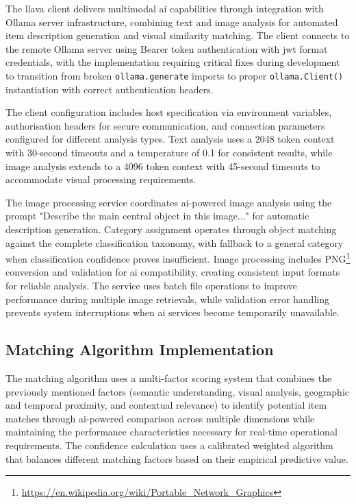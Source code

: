 The \ac{llava} client delivers multimodal \ac{ai} capabilities through integration with Ollama server infrastructure, combining text and image analysis for automated item description generation and visual similarity matching. The client connects to the remote Ollama server using Bearer token authentication with \ac{jwt} format credentials, with the implementation requiring critical fixes during development to transition from broken \texttt{ollama.generate} imports to proper \texttt{ollama.Client()} instantiation with correct authentication headers.


The client configuration includes host specification via environment variables, authorisation headers for secure communication, and connection parameters configured for different analysis types. Text analysis uses a 2048 token context with 30-second timeouts and a temperature of 0.1 for consistent results, while image analysis extends to a 4096 token context with 45-second timeouts to accommodate visual processing requirements.

The image processing service coordinates \ac{ai}-powered image analysis using the prompt "Describe the main central object in this image..." for automatic description generation. Category assignment operates through object matching against the complete classification taxonomy, with fallback to a general category when classification confidence proves insufficient. Image processing includes PNG\footnote{\url{https://en.wikipedia.org/wiki/Portable_Network_Graphics}} conversion and validation for \ac{ai} compatibility, creating consistent input formats for reliable analysis. The service uses batch file operations to improve performance during multiple image retrievals, while validation error handling prevents system interruptions when \ac{ai} services become temporarily unavailable.

\subsection{Matching Algorithm Implementation} \label{subsection:matching_algorithm}

The matching algorithm uses a multi-factor scoring system that combines the previously mentioned factors (semantic understanding, visual analysis, geographic and temporal proximity, and contextual relevance) to identify potential item matches through \ac{ai}-powered comparison across multiple dimensions while maintaining the performance characteristics necessary for real-time operational requirements. The confidence calculation uses a calibrated weighted algorithm that balances different matching factors based on their empirical predictive value.


